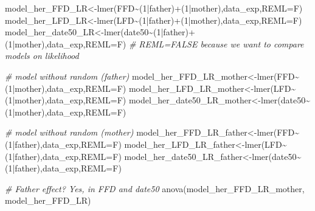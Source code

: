 \documentclass[
]{article}
\newenvironment{Shaded}{\begin{snugshade}}{\end{snugshade}}
\newcommand{\AttributeTok}[1]{\textcolor[rgb]{0.77,0.63,0.00}{#1}}
\newcommand{\CommentTok}[1]{\textcolor[rgb]{0.56,0.35,0.01}{\textit{#1}}}
\newcommand{\DecValTok}[1]{\textcolor[rgb]{0.00,0.00,0.81}{#1}}
\newcommand{\FunctionTok}[1]{\textcolor[rgb]{0.00,0.00,0.00}{#1}}
\newcommand{\NormalTok}[1]{#1}
\newcommand{\OtherTok}[1]{\textcolor[rgb]{0.56,0.35,0.01}{#1}}
\newcommand{\SpecialCharTok}[1]{\textcolor[rgb]{0.00,0.00,0.00}{#1}}
\begin{document}
\begin{Shaded}
\begin{Highlighting}[]
\NormalTok{model\_her\_FFD\_LR}\OtherTok{\textless{}{-}}\FunctionTok{lmer}\NormalTok{(FFD}\SpecialCharTok{\textasciitilde{}}\NormalTok{(}\DecValTok{1}\SpecialCharTok{|}\NormalTok{father)}\SpecialCharTok{+}\NormalTok{(}\DecValTok{1}\SpecialCharTok{|}\NormalTok{mother),data\_exp,}\AttributeTok{REML=}\NormalTok{F)}
\NormalTok{model\_her\_LFD\_LR}\OtherTok{\textless{}{-}}\FunctionTok{lmer}\NormalTok{(LFD}\SpecialCharTok{\textasciitilde{}}\NormalTok{(}\DecValTok{1}\SpecialCharTok{|}\NormalTok{father)}\SpecialCharTok{+}\NormalTok{(}\DecValTok{1}\SpecialCharTok{|}\NormalTok{mother),data\_exp,}\AttributeTok{REML=}\NormalTok{F)}
\NormalTok{model\_her\_date50\_LR}\OtherTok{\textless{}{-}}\FunctionTok{lmer}\NormalTok{(date50}\SpecialCharTok{\textasciitilde{}}\NormalTok{(}\DecValTok{1}\SpecialCharTok{|}\NormalTok{father)}\SpecialCharTok{+}\NormalTok{(}\DecValTok{1}\SpecialCharTok{|}\NormalTok{mother),data\_exp,}\AttributeTok{REML=}\NormalTok{F)}
\CommentTok{\# REML=FALSE because we want to compare models on likelihood  }

\CommentTok{\# model without random (father)}
\NormalTok{model\_her\_FFD\_LR\_mother}\OtherTok{\textless{}{-}}\FunctionTok{lmer}\NormalTok{(FFD}\SpecialCharTok{\textasciitilde{}}\NormalTok{(}\DecValTok{1}\SpecialCharTok{|}\NormalTok{mother),data\_exp,}\AttributeTok{REML=}\NormalTok{F)}
\NormalTok{model\_her\_LFD\_LR\_mother}\OtherTok{\textless{}{-}}\FunctionTok{lmer}\NormalTok{(LFD}\SpecialCharTok{\textasciitilde{}}\NormalTok{(}\DecValTok{1}\SpecialCharTok{|}\NormalTok{mother),data\_exp,}\AttributeTok{REML=}\NormalTok{F)}
\NormalTok{model\_her\_date50\_LR\_mother}\OtherTok{\textless{}{-}}\FunctionTok{lmer}\NormalTok{(date50}\SpecialCharTok{\textasciitilde{}}\NormalTok{(}\DecValTok{1}\SpecialCharTok{|}\NormalTok{mother),data\_exp,}\AttributeTok{REML=}\NormalTok{F)}

\CommentTok{\# model without random (mother)}
\NormalTok{model\_her\_FFD\_LR\_father}\OtherTok{\textless{}{-}}\FunctionTok{lmer}\NormalTok{(FFD}\SpecialCharTok{\textasciitilde{}}\NormalTok{(}\DecValTok{1}\SpecialCharTok{|}\NormalTok{father),data\_exp,}\AttributeTok{REML=}\NormalTok{F)}
\NormalTok{model\_her\_LFD\_LR\_father}\OtherTok{\textless{}{-}}\FunctionTok{lmer}\NormalTok{(LFD}\SpecialCharTok{\textasciitilde{}}\NormalTok{(}\DecValTok{1}\SpecialCharTok{|}\NormalTok{father),data\_exp,}\AttributeTok{REML=}\NormalTok{F)}
\NormalTok{model\_her\_date50\_LR\_father}\OtherTok{\textless{}{-}}\FunctionTok{lmer}\NormalTok{(date50}\SpecialCharTok{\textasciitilde{}}\NormalTok{(}\DecValTok{1}\SpecialCharTok{|}\NormalTok{father),data\_exp,}\AttributeTok{REML=}\NormalTok{F)}

\CommentTok{\# Father effect? Yes, in FFD and date50}
\FunctionTok{anova}\NormalTok{(model\_her\_FFD\_LR\_mother, model\_her\_FFD\_LR)}
\end{Highlighting}
\end{Shaded}
\end{document}
